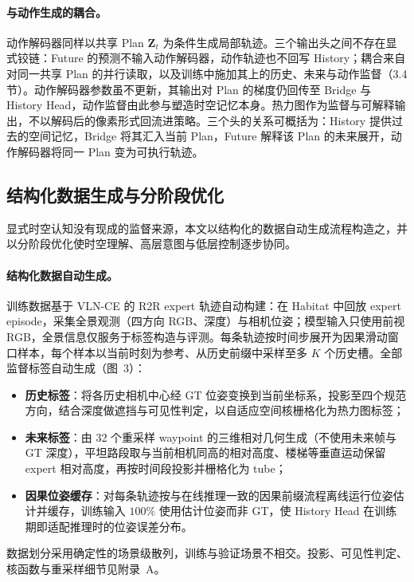 \documentclass[10pt]{ctexart}
\begin{document}
\paragraph{与动作生成的耦合。}
动作解码器同样以共享 Plan $\mathbf{Z}_t$ 为条件生成局部轨迹。三个输出头之间不存在显式铰链：Future 的预测不输入动作解码器，动作轨迹也不回写 History；耦合来自对同一共享 Plan 的并行读取，以及训练中施加其上的历史、未来与动作监督（3.4 节）。动作解码器参数虽不更新，其输出对 Plan 的梯度仍回传至 Bridge 与 History Head，动作监督由此参与塑造时空记忆本身。热力图作为监督与可解释输出，不以解码后的像素形式回流进策略。三个头的关系可概括为：History 提供过去的空间记忆，Bridge 将其汇入当前 Plan，Future 解释该 Plan 的未来展开，动作解码器将同一 Plan 变为可执行轨迹。

\subsection{结构化数据生成与分阶段优化}
\label{sec:training}

显式时空认知没有现成的监督来源，本文以结构化的数据自动生成流程构造之，并以分阶段优化使时空理解、高层意图与低层控制逐步协同。

\paragraph{结构化数据自动生成。}
训练数据基于 VLN-CE 的 R2R expert 轨迹自动构建：在 Habitat 中回放 expert episode，采集全景观测（四方向 RGB、深度）与相机位姿；模型输入只使用前视 RGB，全景信息仅服务于标签构造与评测。每条轨迹按时间步展开为因果滑动窗口样本，每个样本以当前时刻为参考、从历史前缀中采样至多 $K$ 个历史槽。全部监督标签自动生成（图~3）：

\begin{itemize}
    \item \textbf{历史标签}：将各历史相机中心经 GT 位姿变换到当前坐标系，投影至四个规范方向，结合深度做遮挡与可见性判定，以自适应空间核栅格化为热力图标签；
    \item \textbf{未来标签}：由 32 个重采样 waypoint 的三维相对几何生成（不使用未来帧与 GT 深度），平坦路段取与当前相机同高的相对高度、楼梯等垂直运动保留 expert 相对高度，再按时间段投影并栅格化为 tube；
    \item \textbf{因果位姿缓存}：对每条轨迹按与在线推理一致的因果前缀流程离线运行位姿估计并缓存，训练输入 $100\%$ 使用估计位姿而非 GT，使 History Head 在训练期即适配推理时的位姿误差分布。
\end{itemize}

数据划分采用确定性的场景级散列，训练与验证场景不相交。投影、可见性判定、核函数与重采样细节见附录~A。
\end{document}
